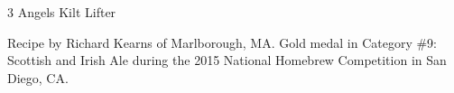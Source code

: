\documentclass[parskip=half,fontsize=9pt,oneside]{scrbook}
\begin{document}
\mainmatter


\begin{recipe}{3 Angels Kilt Lifter}

\begin{aboutblock}
Recipe by Richard Kearns of Marlborough, MA. Gold medal in Category \#9: Scottish
and Irish Ale during the 2015 National Homebrew Competition in San Diego, CA.
\sourceaha
\end{aboutblock}


\begin{methodandtiming}

\begin{mashsteps}
\end{mashsteps}

\begin{fermentationsteps}
\end{fermentationsteps}

\end{methodandtiming}

\recipebreak

\begin{ingredientsblock}

\begin{malts}
\end{malts}

\begin{hops}
\end{hops}


\end{ingredientsblock}

\end{recipe}


\end{document}
